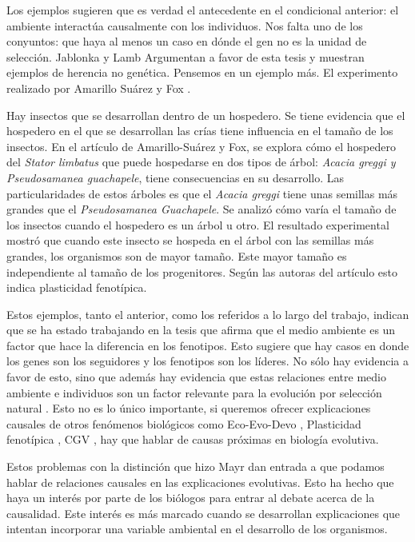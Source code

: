 Los ejemplos sugieren que es verdad el antecedente en el condicional anterior: el ambiente interactúa causalmente con los individuos. Nos falta uno de los conyuntos: que haya al menos un caso en dónde el gen no es la unidad de selección. Jablonka y Lamb Argumentan a favor de esta tesis y muestran ejemplos de herencia no genética. Pensemos en un ejemplo más. El experimento realizado por Amarillo Suárez y Fox \citeyear{Amarillo-Suarez2006}.

Hay insectos que se desarrollan dentro de un hospedero. Se tiene evidencia que el hospedero en el que se desarrollan las crías tiene influencia en el tamaño de los insectos. En el artículo de Amarillo-Suárez y Fox, se explora cómo el hospedero del \emph{Stator limbatus} que puede hospedarse en dos tipos de árbol: \emph{Acacia greggi y Pseudosamanea guachapele}, tiene consecuencias en su desarrollo. Las particularidades de estos árboles es que el \emph{Acacia greggi} tiene unas semillas más grandes que el \emph{Pseudosamanea Guachapele}. Se analizó cómo varía el tamaño de los insectos cuando el hospedero es un árbol u otro. El resultado experimental mostró que cuando este insecto se hospeda en el árbol con las semillas más grandes, los organismos son de mayor tamaño. Este mayor tamaño es independiente al tamaño de los progenitores. Según las autoras del artículo esto indica plasticidad fenotípica.

Estos ejemplos, tanto el anterior, como los referidos a lo largo del trabajo, indican que se ha estado trabajando en la tesis que afirma que el medio ambiente es un factor que hace la diferencia en los fenotipos. Esto sugiere que hay casos en donde los genes son los seguidores y los fenotipos son los líderes. No sólo hay evidencia a favor de esto, sino que además hay evidencia que estas relaciones entre medio ambiente e individuos son un factor relevante para la evolución por selección natural \cite{Jablonka2020, Dayan2020, MacColl2011}. Esto no es lo único importante, si queremos ofrecer explicaciones causales de otros fenómenos biológicos como Eco-Evo-Devo \cite{PfenningEco-Evo-Devo}, Plasticidad fenotípica \cite{WESTEBERHARD20082701}, CGV \cite{CVG}, hay que hablar de causas próximas en biología evolutiva.

Estos problemas con la distinción que hizo Mayr dan entrada a que podamos hablar de relaciones causales en las explicaciones evolutivas. Esto ha hecho que haya un interés por parte de los biólogos para entrar al debate acerca de la causalidad. Este interés es más marcado cuando se desarrollan explicaciones que intentan incorporar una variable ambiental en el desarrollo de los organismos.

